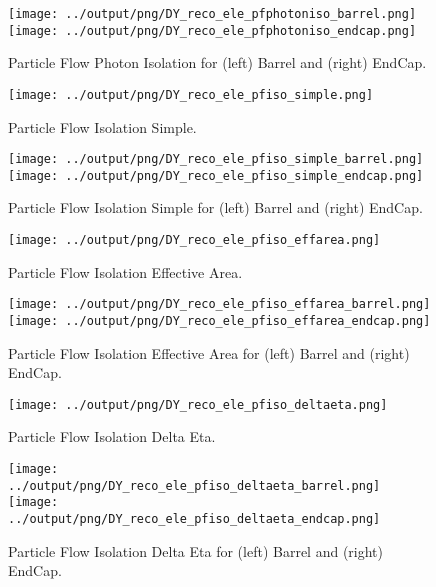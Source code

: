 \documentclass[11pt]{book}
\begin{document}
\begin{figure}[ht]
\centering
\texttt{[image: ../output/png/DY\_reco\_ele\_pfphotoniso\_barrel.png]}
\texttt{[image: ../output/png/DY\_reco\_ele\_pfphotoniso\_endcap.png]}
\caption{Particle Flow Photon Isolation for (left) Barrel and (right) EndCap.}
\label{fig:dy_reco_ele_pfphotoniso_regions}
\end{figure}

\begin{figure}[ht]
\centering
\texttt{[image: ../output/png/DY\_reco\_ele\_pfiso\_simple.png]}
\caption{Particle Flow Isolation Simple.}
\label{fig:dy_reco_ele_pfiso_simple}
\end{figure}

\begin{figure}[ht]
\centering
\texttt{[image: ../output/png/DY\_reco\_ele\_pfiso\_simple\_barrel.png]}
\texttt{[image: ../output/png/DY\_reco\_ele\_pfiso\_simple\_endcap.png]}
\caption{Particle Flow Isolation Simple for (left) Barrel and (right) EndCap.}
\label{fig:dy_reco_ele_pfiso_simple_regions}
\end{figure}


\begin{figure}[ht]
\centering
\texttt{[image: ../output/png/DY\_reco\_ele\_pfiso\_effarea.png]}
\caption{Particle Flow Isolation Effective Area.}
\label{fig:dy_reco_ele_pfiso_effarea}
\end{figure}

\begin{figure}[ht]
\centering
\texttt{[image: ../output/png/DY\_reco\_ele\_pfiso\_effarea\_barrel.png]}
\texttt{[image: ../output/png/DY\_reco\_ele\_pfiso\_effarea\_endcap.png]}
\caption{Particle Flow Isolation Effective Area for (left) Barrel and (right) EndCap.}
\label{fig:dy_reco_ele_pfiso_effarea_regions}
\end{figure}


\begin{figure}[ht]
\centering
\texttt{[image: ../output/png/DY\_reco\_ele\_pfiso\_deltaeta.png]}
\caption{Particle Flow Isolation Delta Eta.}
\label{fig:dy_reco_ele_pfiso_deltaeta}
\end{figure}

\begin{figure}[ht]
\centering
\texttt{[image: ../output/png/DY\_reco\_ele\_pfiso\_deltaeta\_barrel.png]}
\texttt{[image: ../output/png/DY\_reco\_ele\_pfiso\_deltaeta\_endcap.png]}
\caption{Particle Flow Isolation Delta Eta for (left) Barrel and (right) EndCap.}
\label{fig:dy_reco_ele_pfiso_deltaeta_regions}
\end{figure}
\end{document}
